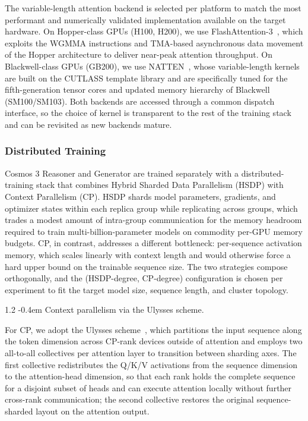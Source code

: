 \documentclass{llmxive}
\makeatletter
\providecommand{\paragraph}{  \@startsection{paragraph}{4}{\z@}    {1\baselineskip \@plus .2\baselineskip}    {-0.4em}    {\normalfont\normalsize\bfseries}}
\makeatother
\begin{document}
The variable-length attention backend is selected per platform to match the most performant and numerically validated implementation available on the target hardware. On Hopper-class GPUs (H100, H200), we use FlashAttention-3~\citep{flash3}, which exploits the WGMMA instructions and TMA-based asynchronous data movement of the Hopper architecture to deliver near-peak attention throughput. On Blackwell-class GPUs (GB200), we use NATTEN~\citep{natten}, whose variable-length kernels are built on the CUTLASS template library and are specifically tuned for the fifth-generation tensor cores and updated memory hierarchy of Blackwell (SM100/SM103). Both backends are accessed through a common dispatch interface, so the choice of kernel is transparent to the rest of the training stack and can be revisited as new backends mature.

\subsubsection{Distributed Training}

Cosmos 3 Reasoner and Generator are trained separately with a distributed-training stack that combines Hybrid Sharded Data Parallelism (HSDP) with Context Parallelism (CP). HSDP shards model parameters, gradients, and optimizer states within each replica group while replicating across groups, which trades a modest amount of intra-group communication for the memory headroom required to train multi-billion-parameter models on commodity per-GPU memory budgets. CP, in contrast, addresses a different bottleneck: per-sequence activation memory, which scales linearly with context length and would otherwise force a hard upper bound on the trainable sequence size. The two strategies compose orthogonally, and the (HSDP-degree, CP-degree) configuration is chosen per experiment to fit the target model size, sequence length, and cluster topology.

\paragraph{Context parallelism via the Ulysses scheme.}

For CP, we adopt the Ulysses scheme~\citep{deepspeed_ulysses}, which partitions the input sequence along the token dimension across CP-rank devices outside of attention and employs two all-to-all collectives per attention layer to transition between sharding axes. The first collective redistributes the Q/K/V activations from the sequence dimension to the attention-head dimension, so that each rank holds the complete sequence for a disjoint subset of heads and can execute attention locally without further cross-rank communication; the second collective restores the original sequence-sharded layout on the attention output.
\end{document}
